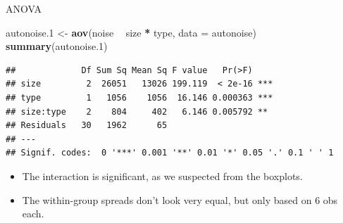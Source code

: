 \documentclass[ignorenonframetext,]{beamer}
\newenvironment{Shaded}{\begin{snugshade}}{\end{snugshade}}
\newcommand{\DataTypeTok}[1]{\textcolor[rgb]{0.13,0.29,0.53}{#1}}
\newcommand{\FloatTok}[1]{\textcolor[rgb]{0.00,0.00,0.81}{#1}}
\newcommand{\KeywordTok}[1]{\textcolor[rgb]{0.13,0.29,0.53}{\textbf{#1}}}
\newcommand{\NormalTok}[1]{#1}
\newcommand{\OperatorTok}[1]{\textcolor[rgb]{0.81,0.36,0.00}{\textbf{#1}}}
\newcommand{\StringTok}[1]{\textcolor[rgb]{0.31,0.60,0.02}{#1}}
\begin{document}
\begin{frame}[fragile]{ANOVA}
\protect\hypertarget{anova}{}

\small

\begin{Shaded}
\begin{Highlighting}[]
\NormalTok{autonoise}\FloatTok{.1}\NormalTok{ <-}\StringTok{ }\KeywordTok{aov}\NormalTok{(noise }\OperatorTok{~}\StringTok{ }\NormalTok{size }\OperatorTok{*}\StringTok{ }\NormalTok{type, }\DataTypeTok{data =}\NormalTok{ autonoise)}
\KeywordTok{summary}\NormalTok{(autonoise}\FloatTok{.1}\NormalTok{)}
\end{Highlighting}
\end{Shaded}

\begin{verbatim}
##             Df Sum Sq Mean Sq F value   Pr(>F)    
## size         2  26051   13026 199.119  < 2e-16 ***
## type         1   1056    1056  16.146 0.000363 ***
## size:type    2    804     402   6.146 0.005792 ** 
## Residuals   30   1962      65                     
## ---
## Signif. codes:  0 '***' 0.001 '**' 0.01 '*' 0.05 '.' 0.1 ' ' 1
\end{verbatim}

\normalsize

\begin{itemize}
\item
  The interaction is significant, as we suspected from the boxplots.
\item
  The within-group spreads don't look very equal, but only based on 6
  obs each.
\end{itemize}

\end{frame}
\end{document}
